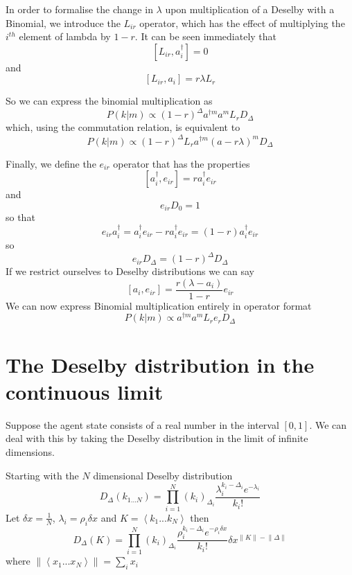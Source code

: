 \documentclass[letterpaper,twocolumn,10pt]{article}
\begin{document}
In order to formalise the change in $\lambda$ upon multiplication of a Deselby with a Binomial, we introduce the $L_{ir}$ operator, which has the effect of multiplying the $i^{th}$ element of lambda by $1-r$. It can be seen immediately that
\[
[L_{ir},a_i^\dag] = 0
\]
and
\[
[L_{ir}, a_i] = r\lambda L_r
\]

So we can express the binomial multiplication as
\begin{equation}
P(k|m) \propto (1-r)^\Delta a^{\dag m}a^mL_r D_{\Delta}
\end{equation}
which, using the commutation relation, is equivalent to
\begin{equation}
P(k|m) \propto (1-r)^\Delta L_r a^{\dag m}(a - r\lambda)^m D_{\Delta}
\end{equation}

Finally, we define the $e_{ir}$ operator that has the properties
\[
[a_i^\dag, e_{ir}] = ra_i^\dag e_{ir}
\]
and
\[
e_{ir}D_0 = 1
\]
so that
\[
e_{ir}a_i^\dag = a_i^\dag e_{ir} - ra_i^\dag e_{ir} = (1-r)a_i^\dag e_{ir}
\]
so
\[
e_{ir}D_\Delta = (1-r)^\Delta D_\Delta
\]
If we restrict ourselves to Deselby distributions we can say
\[
[a_i, e_{ir}] = \frac{r(\lambda - a_i)}{1-r}e_{ir}
\]
We can now express Binomial multiplication entirely in operator format
\begin{equation}
P(k|m) \propto a^{\dag m}a^m L_re_r D_{\Delta}
\end{equation}


\section{The Deselby distribution in the continuous limit}

Suppose the agent state consists of a real number in the interval $[0,1]$. We can deal with this by taking the Deselby distribution in the limit of infinite dimensions.

Starting with the $N$ dimensional Deselby distribution
\[
D_\Delta(k_{1...N}) = \prod_{i=1}^N (k_i)_{\Delta_i}\frac{\lambda_i^{k_i-\Delta_i}e^{-\lambda_i}}{k_i!}
\]
Let $\delta x = \frac{1}{N}$, $\lambda_i = \rho_i \delta x$  and $K = \left< k_1...k_N \right>$ then
\begin{equation}
D_\Delta(K) = \prod_{i=1}^N (k_i)_{\Delta_i}\frac{\rho_i^{k_i-\Delta_i}e^{-\rho_i \delta x}}{k_i!} \delta x^{\lVert K\rVert - \lVert \Delta \rVert}
\label{continuousDeselby}
\end{equation}
where $\lVert \left<x_1...x_N \right> \rVert = \sum_i x_i$
\end{document}
